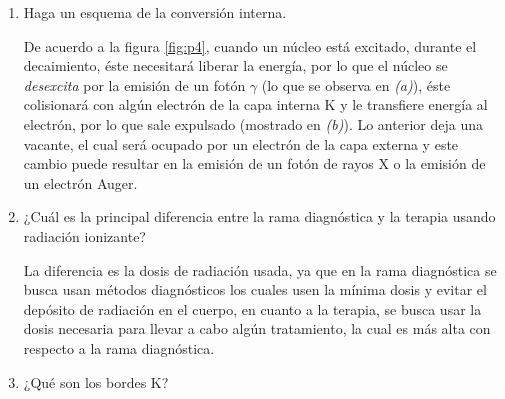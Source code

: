 \begin{enumerate}[1.]
\item Haga un esquema de la conversión interna.

\pagebreak

De acuerdo a la figura \ref{fig:p4}, 
cuando un núcleo está excitado, durante el decaimiento, éste necesitará liberar la energía, por lo que el núcleo se \textit{desexcita} por la emisión de un fotón  $\gamma$ (lo que se observa en \textit{(a)}), éste colisionará con algún electrón de la capa interna K y le transfiere energía al electrón, por lo que sale expulsado (mostrado en \textit{(b)}). Lo anterior deja una vacante, el cual será ocupado por un electrón de la capa externa y este cambio puede resultar en la emisión de un fotón de rayos X o la emisión de un electrón Auger.


\item ¿Cuál es la principal diferencia entre la rama diagnóstica y la terapia usando radiación ionizante?


La diferencia es la dosis de radiación usada, ya que en la rama diagnóstica se busca usan métodos diagnósticos los cuales usen la mínima dosis y evitar el depósito de radiación en el cuerpo, en cuanto a la terapia, se busca usar la dosis necesaria para llevar a cabo algún tratamiento, la cual es más alta con respecto a la rama diagnóstica.







\item  ¿Qué son los bordes K?


\end{enumerate}
